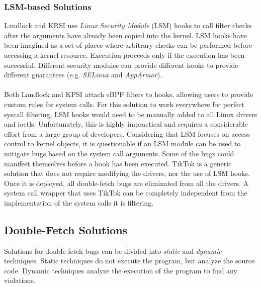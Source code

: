 \subsubsection{LSM-based Solutions}
Landlock\cite{landlock} and KRSI\cite{krsi} use \emph{Linux Security Module}\cite{morris2002linux} (LSM) hooks to call filter checks after the arguments have already been copied into the kernel.
LSM hooks have been imagined as a set of places where arbitrary checks can be performed before accessing a kernel resource. Execution proceeds only if the execution has been successful.
Different security modules can provide different hooks to provide different guarantees (e.g. \emph{SELinux}\cite{smalley2001implementing} and \emph{AppArmor}\cite{gruenbacher2007apparmor}).
\\
\\
Both Landlock and KPSI attach eBPF filters to hooks, allowing users to provide custom rules for system calls. For this solution to work everywhere for perfect syscall filtering, 
LSM hooks would need to be manually added to all Linux drivers and ioctls. Unfortunately, this is highly impractical and requires a considerable effort from a large group of developers.
Considering that LSM focuses on access control to kernel objects, it is questionable if an LSM module can be used to mitigate bugs based on the system call arguments. Some of the
bugs could manifest themselves before a hook has been executed. TikTok is a generic solution that does not require modifying the drivers, nor the use of LSM hooks.
Once it is deployed, all double-fetch bugs are eliminated from all the drivers. A system call wrapper that uses TikTok can be completely independent from the implementation
of the system calls it is filtering.

\subsection{Double-Fetch Solutions}

Solutions for double fetch bugs can be divided into \emph{static} and \emph{dynamic} techniques. Static techniques do not execute the program, but analyze the source code.
Dynamic techniques analyze the execution of the program to find any violations.

